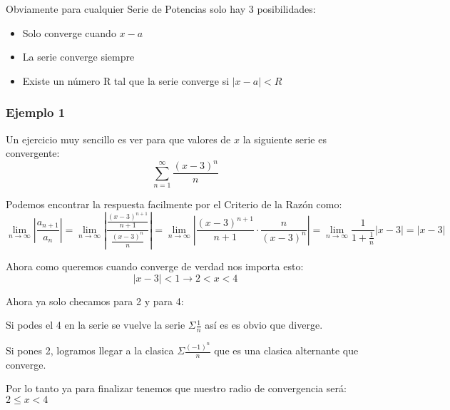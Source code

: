 \documentclass[12pt]{report}                                %
\begin{document}
        Obviamente para cualquier Serie de Potencias solo hay 3 posibilidades:
        \begin{itemize}
            \item Solo converge cuando $x-a$
            \item La serie converge siempre
            \item Existe un número R tal que la serie converge si $|x-a|<R$
        \end{itemize}

        \subsubsection{Ejemplo 1}
            Un ejercicio muy sencillo es ver para que valores de $x$
            la siguiente serie es convergente:
            \begin{equation*}
               \sum_{n=1}^\infty \frac{(x-3)^n}{n}
            \end{equation*}

            Podemos encontrar la respuesta facilmente por el Criterio de la Razón como:
            \begin{equation*}
                \lim_{n \to \infty} \left| \frac{a_{n+1}}{a_n} \right| = 
                \lim_{n \to \infty} \left| \frac{\frac{(x-3)^{n+1}}{n+1}}{\frac{(x-3)^n}{n}} \right| = 
                \lim_{n \to \infty} \left| \frac{(x-3)^{n+1}}{n+1} \cdot \frac{n}{(x-3)^{n}} \right| =
                \lim_{n \to \infty} \frac{1}{1+\frac{1}{n}} |x-3| =
                |x-3|
            \end{equation*}

            Ahora como queremos cuando converge de verdad nos importa esto:
            \begin{equation*}
                |x-3| < 1 \to 2 < x < 4
            \end{equation*}

            Ahora ya solo checamos para 2 y para 4:

            Si podes el 4 en la serie se vuelve la serie $\Sigma \frac{1}{n}$ así es es obvio que diverge.

            Si pones 2, logramos llegar a la clasica $\Sigma \frac{(-1)^n}{n}$ que es una clasica
            alternante que converge.

            Por lo tanto ya para finalizar tenemos que nuestro radio de convergencia será:
            $2 \leq x < 4$
\end{document}
